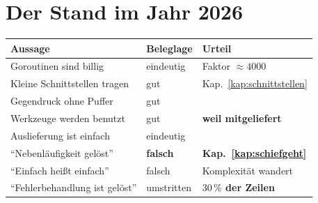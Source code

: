 \chapter{Der Stand im Jahr 2026}\label{kap:aktuell}

\begin{merksatz}
\begin{center}
{\small
\renewcommand{\arraystretch}{1.5}
\begin{tabular}{@{}P{3.6cm}P{2.0cm}P{2.4cm}@{}}
\toprule
\textbf{Aussage} & \textbf{Beleglage} & \textbf{Urteil}\\
\midrule
Goroutinen sind billig & \textcolor{gruen}{eindeutig} & \textcolor{gruen}{Faktor $\approx4000$}\\
Kleine Schnittstellen tragen & \textcolor{gruen}{gut} & \textcolor{gruen}{Kap.~\ref{kap:schnittstellen}}\\
Gegendruck ohne Puffer & \textcolor{gruen}{gut} & \\
Werkzeuge werden benutzt & \textcolor{gruen}{gut} & \textcolor{gruen}{\textbf{weil mitgeliefert}}\\
Auslieferung ist einfach & \textcolor{gruen}{eindeutig} & \\
\midrule
\enquote{Nebenläufigkeit gelöst} & \textcolor{akzent}{\textbf{falsch}} & \textcolor{akzent}{\textbf{Kap.~\ref{kap:schiefgeht}}}\\
\enquote{Einfach heißt einfach} & \textcolor{akzent}{falsch} & \textcolor{akzent}{Komplexität wandert}\\
\enquote{Fehlerbehandlung ist gelöst} & \textcolor{akzent}{umstritten} & \textbf{$30\,\%$ der Zeilen}\\
\bottomrule
\end{tabular}}
\end{center}

\begin{center}
\begin{minipage}{0.88\textwidth}
\end{minipage}
\end{center}
\end{merksatz}

